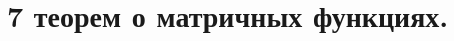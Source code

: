 \documentclass[../../calc-math-exam-2023.tex]{subfiles}
\begin{document}
    \section{7 теорем о матричных функциях.}\label{sec:ch17}
\end{document}
